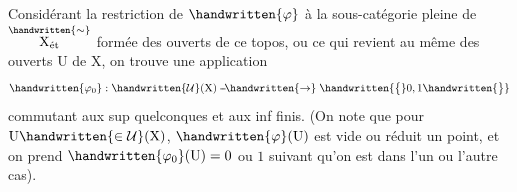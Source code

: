 \newsavebox{\coteFourTypescript}
\begin{lrbox}{\coteFourTypescript}
\begin{minipage}[t]{.96\linewidth}
Considérant la restriction de $\handwritten{\varphi}$ à la sous-catégorie pleine de $\overset{\handwritten{\sim}}{\mathrm{X}_{\text{ét}}}$ formée des ouverts de ce topos, ou ce qui revient au même  des ouverts $\mathrm U$ de $\mathrm X$, on trouve une application
\[
\handwritten{\varphi_{0}}:\handwritten{\mathcal U}(\mathrm X)\mathrel{\mbox{-}\mkern-2mu\mbox{-}\mkern-3mu\handwritten{\to}}\handwritten{\bigl\{}0,1\handwritten{\bigr\}}
\]
commutant aux sup quelconques et aux inf finis. (On note que pour $\mathrm U\handwritten{\in\mathcal U}(\mathrm X)$, $\handwritten{\varphi}(\mathrm U)$ est vide ou réduit un point, et on prend $\handwritten{\varphi_{0}}(\mathrm U)=0$ ou $1$ suivant qu'on est dans l'un ou l'autre cas).


\end{minipage}
\end{lrbox}
